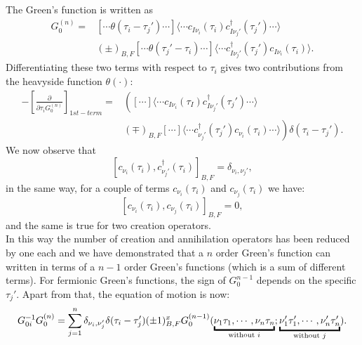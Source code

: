The Green's function is written as 
\begin{equation}
\begin{split}
    G_0^{(n)}=&\left[\cdots \theta(\tau_i-\tau_j')\cdots\right]\langle \cdots c_{I\nu_i}(\tau_i)c^\dagger_{I\nu_j'}(\tau_j')\cdots\rangle \\
    &(\pm)_{B,F}[\cdots \theta(\tau_j'-\tau_i)\cdots]\langle \cdots c^\dagger_{I\nu_j'}(\tau_j')c_{I\nu_i}(\tau_i)\rangle.
\end{split}
\end{equation}
Differentiating these two terms with respect to $\tau_i$ gives two contributions from the heavyside function $\theta(\cdot)$:
\begin{equation}
\begin{split}
    -\left[\frac{\partial}{\partial\tau_iG_0^{(n)}}\right]_{1st-term}=&\left([\cdots]\langle \cdots c_{I\nu_i}(\tau_I)c^\dagger_{I\nu_j'}(\tau_j')\cdots\rangle \right.\\
    &\left. (\mp)_{B,F}[\cdots]\langle \cdots c^\dagger_{\nu_j'}(\tau_j')c_{\nu_i}(\tau_i)\cdots\rangle \right)\delta(\tau_i-\tau_j').
\end{split}
\end{equation}
We now observe that
\begin{equation}
    \left[c_{\nu_i}(\tau_i),c^\dagger_{\nu_j'}(\tau_i)\right]_{B,F}=\delta_{\nu_i,\nu_j'},
\end{equation}
in the same way, for a couple of terms $c_{\nu_i}(\tau_i)$ and $c_{\nu_j}(\tau_i)$ we have:
\begin{equation}
    \left[c_{\nu_i}(\tau_i),c_{\nu_j}(\tau_i)\right]_{B,F}=0,
\end{equation}
and the same is true for two creation operators.\\
In this way the number of creation and annihilation operators has been reduced by one each and we have demonstrated that a $n$ order Green's function 
can written in terms of a $n-1$ order Green's functions (which is a sum of different terms). For fermionic Green's functions, the sign of $G_0^{n-1}$ 
depends on the specific $\tau_j'$. Apart from that, the equation of motion is now:
\begin{equation}
    G^{-1}_{0i}G^{(n)}_0=\sum_{j=1}^n\delta_{\nu_i,\nu_j'}\delta(\tau_i-\tau_j')(\pm1)^x_{B,F}G_0^{(n-1)}(\underbracket[1.5pt][3pt]{\nu_1\tau_1,\cdots,\nu_n\tau_n}_{\mathclap{\text{without $i$}}};\underbracket[1.5pt][3pt]{\nu_1'\tau_1',\cdots,\nu_n'\tau_n'}_{\mathclap{\text{without $j$}}}).
\end{equation}
